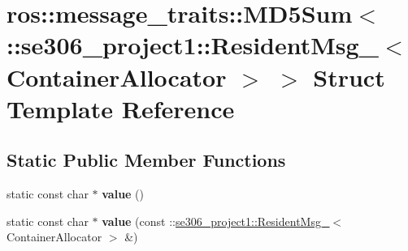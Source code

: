 \hypertarget{structros_1_1message__traits_1_1MD5Sum_3_01_1_1se306__project1_1_1ResidentMsg___3_01ContainerAllocator_01_4_01_4}{\section{ros\-:\-:message\-\_\-traits\-:\-:M\-D5\-Sum$<$ \-:\-:se306\-\_\-project1\-:\-:Resident\-Msg\-\_\-$<$ Container\-Allocator $>$ $>$ Struct Template Reference}
\label{structros_1_1message__traits_1_1MD5Sum_3_01_1_1se306__project1_1_1ResidentMsg___3_01ContainerAllocator_01_4_01_4}
}
\subsection*{Static Public Member Functions}
\begin{DoxyCompactItemize}
\item 
\hypertarget{structros_1_1message__traits_1_1MD5Sum_3_01_1_1se306__project1_1_1ResidentMsg___3_01ContainerAllocator_01_4_01_4_a4b4e542d789bbf861e057e4b92121eba}{static const char $\ast$ {\bfseries value} ()}\label{structros_1_1message__traits_1_1MD5Sum_3_01_1_1se306__project1_1_1ResidentMsg___3_01ContainerAllocator_01_4_01_4_a4b4e542d789bbf861e057e4b92121eba}

\item 
\hypertarget{structros_1_1message__traits_1_1MD5Sum_3_01_1_1se306__project1_1_1ResidentMsg___3_01ContainerAllocator_01_4_01_4_ae56825e64f6dba43dbd980a0696c277b}{static const char $\ast$ {\bfseries value} (const \-::\hyperlink{structse306__project1_1_1ResidentMsg__}{se306\-\_\-project1\-::\-Resident\-Msg\-\_\-}$<$ Container\-Allocator $>$ \&)}\label{structros_1_1message__traits_1_1MD5Sum_3_01_1_1se306__project1_1_1ResidentMsg___3_01ContainerAllocator_01_4_01_4_ae56825e64f6dba43dbd980a0696c277b}

\end{DoxyCompactItemize}

